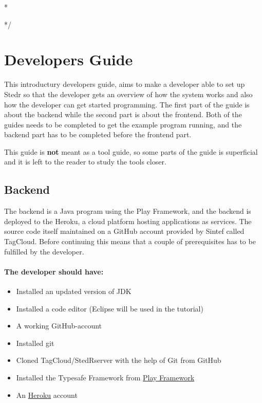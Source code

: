 
\/*

\usepackage{pslatex,palatino,avant,graphicx,color}
\usepackage[margin=2cm]{geometry}

%
*/


\section{Developers Guide}
This introductury developers guide, aims to make a developer able to set up Stedr so that the developer gets an overview of how the system works and also how the developer can get started programming. The first part of the guide is about the backend while the second part is about the frontend. Both of the guides needs to be completed to get the example program running, and the backend part has to be completed before the frontend part. 

\noindent

This guide is \textbf{not} meant as a tool guide, so some parts of the guide is superficial and it is left to the reader to study the tools closer.

\subsection{Backend}

The backend is a Java program using the Play Framework, and the backend is deployed to the Heroku, a cloud platform hosting applications as services. The source code itself maintained on a GitHub account provided by Sintef called TagCloud. Before continuing this means that a couple of prerequisites has to be fulfilled by the developer.

\paragraph{The developer should have:}
\begin{itemize}
\item Installed an updated version of JDK 
\item Installed a code editor (Eclipse will be used in the tutorial)
\item A working GitHub-account
\item Installed git
\item Cloned TagCloud/StedR\textunderscore server with the help of Git from GitHub
\item Installed the Typesafe Framework from \href{http://www.playframework.com/download}{Play Framework}
\item An \href{https://www.heroku.com/}{Heroku} account 
\end{itemize}  

